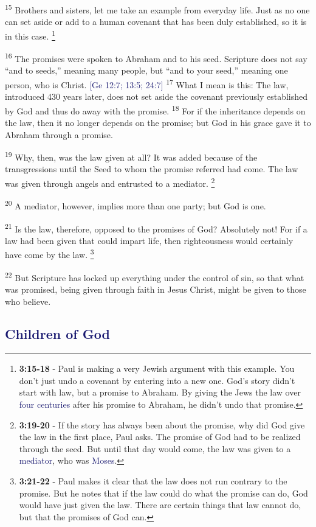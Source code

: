 \documentclass[12pt,twoside]{article}
\newcommand{\vs}[1]{\textsuperscript{#1}}
\newcommand{\vnote}[2]{%
  \begingroup
  \renewcommand\thefootnote{}%
  \footnote{\scriptsize \textbf{}#2}%
  \addtocounter{footnote}{-1}%
  \endgroup
}
\begin{document}
 \hspace{0.5cm} \vs{15} Brothers and sisters, let me take an example from everyday life. Just as no one can set aside or add to a human covenant that has been duly established, so it is in this case.\vnote{15}{\textbf{3:15-18} - Paul is making a very Jewish argument with this example. You don't just undo a covenant by entering into a new one. God's story didn't start with law, but a promise to Abraham. By giving the Jews the law over \textcolor{MidnightBlue}{four centuries} after his promise to Abraham, he didn't undo that promise.}
 \vs{16} The promises were spoken to Abraham and to his seed. Scripture does not say ``and to seeds,'' meaning many people, but ``and to your seed,'' meaning one person, who is Christ. {\fontsize{8pt}{5pt}\selectfont\textcolor{MidnightBlue}{[Ge 12:7; 13:5; 24:7]}}
 \vs{17} What I mean is this: The law, introduced 430 years later, does not set aside the covenant previously established by God and thus do away with the promise.
 \vs{18} For if the inheritance depends on the law, then it no longer depends on the promise; but God in his grace gave it to Abraham through a promise.

 \vs{19} Why, then, was the law given at all? It was added because of the transgressions until the Seed to whom the promise referred had come. The law was given through angels and entrusted to a mediator.\vnote{19}{\textbf{3:19-20} - If the story has always been about the promise, why did God give the law in the first place, Paul asks. The promise of God had to be realized through the seed. But until that day would come, the law was given to a \textcolor{MidnightBlue}{mediator}, who was \textcolor{MidnightBlue}{Moses}.}
 \vs{20} A mediator, however, implies more than one party; but God is one.

 \vs{21} Is the law, therefore, opposed to the promises of God? Absolutely not! For if a law had been given that could impart life, then righteousness would certainly have come by the law.\vnote{21}{\textbf{3:21-22} - Paul makes it clear that the law does not run contrary to the promise. But he notes that if the law could do what the promise can do, God would have just given the law. There are certain things that law cannot do, but that the promises of God can.}
 \vs{22} But Scripture has locked up everything under the control of sin, so that what was promised, being given through faith in Jesus Christ, might be given to those who believe.

 \subsection*{\textcolor{MidnightBlue}{\textbf{Children of God}}}
\end{document}
